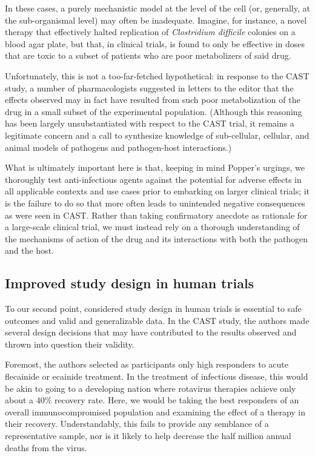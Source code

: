 \documentclass[11pt,final,twocolumn,twoside] {article}
\begin{document}
In these cases, a purely mechanistic model at the level of the cell (or, generally, at the sub-organismal level) may often be inadequate. Imagine, for instance, a novel therapy that effectively halted replication of {\itshape Clostridium difficile} colonies on a blood agar plate, but that, in clinical trials, is found to only be effective in doses that are toxic to a subset of patients who are poor metabolizers of said drug.

Unfortunately, this is not a too-far-fetched hypothetical: in response to the CAST study, a number of pharmacologists suggested in letters to the editor that the effects observed may in fact have resulted from such poor metabolization of the drug in a small subset of the experimental population.\cite{CAST_Review} (Although this reasoning has been largely unsubstantiated with respect to the CAST trial, it remains a legitimate concern and a call to synthesize knowledge of sub-cellular, cellular, and animal models of pathogens and pathogen-host interactions.)

What is ultimately important here is that, keeping in mind Popper's urgings, we thoroughly test anti-infectious agents against the potential for adverse effects in all applicable contexts and use cases prior to embarking on larger clinical trials; it is the failure to do so that more often leads to unintended negative consequences as were seen in CAST. Rather than taking confirmatory anecdote as rationale for a large-scale clinical trial, we must instead rely on a thorough understanding of the mechanisms of action of the drug and its interactions with both the pathogen and the host.

\subsection*{Improved study design in human trials}

To our second point, considered study design in human trials is essential to safe outcomes and valid and generalizable data. In the CAST study, the authors made several design decisions that may have contributed to the results observed and thrown into question their validity.

Foremost, the authors selected as participants only high responders to acute flecainide or ecainide treatment. In the treatment of infectious disease, this would be akin to going to a developing nation where rotavirus therapies achieve only about a $40\%$ recovery rate.\cite{Jiang} Here, we would be taking the best responders of an overall immunocompromised population and examining the effect of a therapy in their recovery. Understandably, this fails to provide any semblance of a representative sample, nor is it likely to help decrease the half million annual deaths from the virus.\cite{Tate,WHO}
\end{document}
